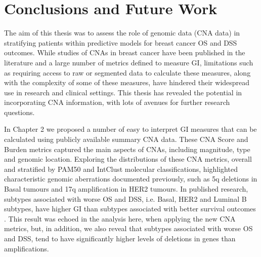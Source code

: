 \section{Conclusions and Future Work}
The aim of this thesis was to assess the role of genomic data (CNA data) in stratifying patients within predictive models for breast cancer OS and DSS outcomes. While studies of CNAs in breast cancer have been published in the literature and a large number of metrics defined to measure GI, limitations such as requiring access to raw or segmented data to calculate these measures, along with the complexity of some of these measures, have hindered their widespread use in research and clinical settings. This thesis has revealed the potential in incorporating CNA information, with lots of avenues for further research questions.  

In Chapter 2 we proposed a number of easy to interpret GI measures that can be calculated using publicly available summary CNA data. These CNA Score and Burden metrics captured the main aspects of CNAs, including magnitude, type and genomic location. Exploring the distributions of these CNA metrics, overall and stratified by PAM50 and IntClust molecular classifications, highlighted characteristic genomic aberrations documented previously, such as 5q deletions in Basal tumours and 17q amplification in HER2 tumours. In published research, subtypes associated with worse OS and DSS, i.e. Basal, HER2 and Luminal B subtypes, have higher GI than subtypes associated with better survival outcomes \citep{pmid22522925}. This result was echoed in the analysis here, when applying the new CNA metrics, but, in addition, we also reveal that subtypes associated with worse OS and DSS, tend to have significantly higher levels of deletions in genes than amplifications. 

